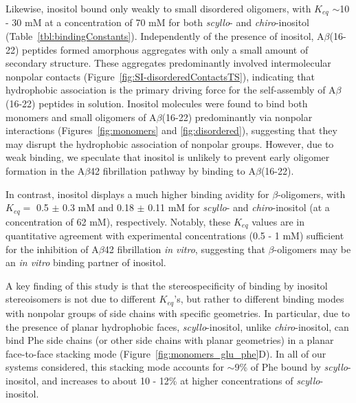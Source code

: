 Likewise, inositol bound only weakly to small disordered oligomers, with $K_{eq}$ $\sim$10 - 30 mM at a concentration of 70 mM for both \emph{scyllo}- and \emph{chiro}-inositol (Table~\ref{tbl:bindingConstants}). Independently of the presence of inositol,  A$\beta$(16-22) peptides formed amorphous aggregates with only a small amount of secondary structure. These aggregates predominantly involved intermolecular nonpolar contacts (Figure~\ref{fig:SI-disorderedContactsTS}), 
indicating that hydrophobic association is the primary driving force for the self-assembly of A$\beta$(16-22) peptides in solution. Inositol molecules were found to bind both monomers and small oligomers of A$\beta$(16-22) predominantly via nonpolar interactions (Figures~{\ref{fig:monomers}} and {\ref{fig:disordered}}),  suggesting that they may disrupt the hydrophobic association of nonpolar groups. However, due to weak binding, we speculate that inositol is unlikely to prevent early oligomer formation in the A$\beta$42 fibrillation pathway by binding to A$\beta$(16-22).

In contrast, inositol displays a much higher binding avidity for $\beta$-oligomers, with $K_{eq}=$ 0.5 $\pm$ 0.3 mM and  0.18 $\pm$ 0.11 mM for \emph{scyllo}- and \emph{chiro}-inositol (at a concentration of 62 mM), respectively. Notably, these $K_{eq}$ values are in quantitative agreement with experimental concentrations (0.5 - 1 mM) sufficient for the inhibition of A$\beta$42 fibrillation \emph{in vitro},\cite{McLaurin:2000p64} suggesting that $\beta$-oligomers may be an \emph{in vitro} binding partner of inositol.

A key finding of this study is that the stereospecificity of binding by inositol stereoisomers is not due to different $K_{eq}$'s, but rather to different binding modes with nonpolar groups of side chains with specific geometries. In particular, due to the presence of planar hydrophobic faces, \emph{scyllo}-inositol, unlike \emph{chiro}-inositol, can bind Phe side chains (or other side chains with planar geometries) in a planar face-to-face stacking mode (Figure~\ref{fig:monomers_glu_phe}D). In all of our systems considered, this stacking mode accounts for $\sim$9\% of Phe bound by \emph{scyllo}-inositol, and increases to about 10 - 12\% at higher concentrations of \emph{scyllo}-inositol.


